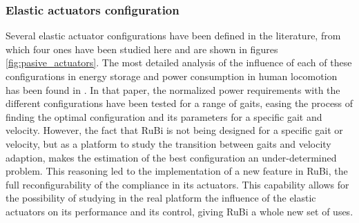 \subsubsection{Elastic actuators configuration} %
\label{ssub:elastic_actuator_configuration}
Several elastic actuator configurations have been defined in the literature, from which four ones have been studied here and are shown in figures \ref{fig:pasive_actuators}.
The most detailed analysis of the influence of each of these configurations in energy storage and power consumption in human locomotion has been found in \cite{grimmer}.
In that paper, the normalized power requirements with the different configurations have been tested for a range of gaits, easing the process of finding the optimal configuration and its parameters for a specific gait and velocity.
However, the fact that RuBi is not being designed for a specific gait or velocity, but as a platform to study the transition between gaits and velocity adaption, makes the estimation of the best configuration an under-determined problem.
This reasoning led to the implementation of a new feature in RuBi, the full reconfigurability of the compliance in its actuators.
This capability allows for the possibility of studying in the real platform the influence of the elastic actuators on its performance and its control, giving RuBi a whole new set of uses.

